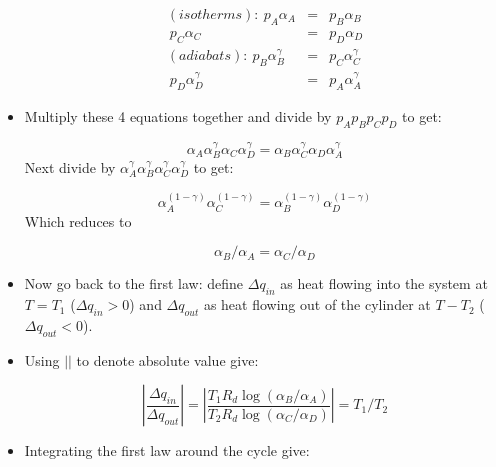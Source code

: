 \documentclass[12pt]{article}
\begin{document}
\begin{itemize}
\begin{subequations}
\begin{eqnarray}
  \label{eq:isoadia}
  (isotherms):\ p_A \alpha_A &=&p_B \alpha_B\\ 
             \ p_C \alpha_C &=&p_D \alpha_D\\
  (adiabats):\ p_B \alpha_B^\gamma &=&p_C \alpha_C^\gamma\\ 
             \ p_D \alpha_D^\gamma &=&p_A \alpha_A^\gamma
\end{eqnarray}
\end{subequations}


\item Multiply these 4 equations together and divide by $p_A p_B p_C p_D$ to get:

  \begin{equation}
    \label{eq:alpha}
     \alpha_A \alpha_B^\gamma \alpha_C \alpha_D^\gamma = \alpha_B \alpha_C^\gamma \alpha_D \alpha_A^\gamma
  \end{equation}
Next divide by $\alpha_A^\gamma \alpha_B^\gamma \alpha_C^\gamma \alpha_D^\gamma$ to get:

\begin{equation}
  \label{eq:alpha2}
     \alpha_A^{(1-\gamma)} \alpha_C^{(1-\gamma)} =  \alpha_B^{(1-\gamma)} \alpha_D^{(1-\gamma)}
\end{equation}
Which reduces to

\begin{equation}
  \label{eq:alpha3}
  \alpha_B/\alpha_A = \alpha_C / \alpha_D
\end{equation}



\item Now go back to the first law:  define $\Delta q_{in}$ as heat flowing into the system at $T=T_1$
($\Delta q_{in} > 0$) and $\Delta q_{out}$ as heat flowing out of the cylinder at $T-T_2$ ($\Delta q_{out} < 0$).


\item Using $||$ to denote absolute value give:

\begin{equation}
  \label{eq:effic1}
  \left | \frac{\Delta q_{in}}{\Delta q_{out}} \right | =\left | \frac{T_1 R_d \log (\alpha_B/\alpha_A )}
     {T_2 R_d \log (\alpha_C/\alpha_D )} \right | = T_1/T_2
\end{equation}


\item Integrating the first law around the cycle give:


\end{itemize}
\end{document}
